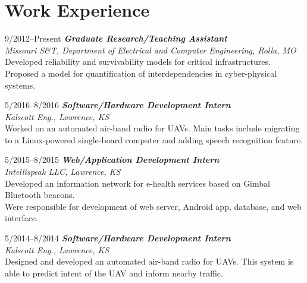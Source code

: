 \documentclass[10pt]{article}
\newlength{\Vspace}
\newlength{\Vspace}
\begin{document}
\section{Work Experience}

\begin{CV}

\item[9/2012--Present] \textbf{\textit{Graduate Research/Teaching Assistant}} \\
    \textit{Missouri S\&T, Department of Electrical and Computer Engineering, Rolla, MO}\vspace{\Vspace} \\
    Developed reliability and survivability models for critical infrastructures. \\
    Proposed a model for quantification of interdependencies in cyber-physical systems. \\

\item[5/2016--8/2016] \textbf{\textit{Software/Hardware Development Intern}} \\
    \textit{Kalscott Eng., Lawrence, KS}\vspace{\Vspace} \\
    Worked on an automated air-band radio for UAVs. Main tasks include migrating to a Linux-powered single-board computer and adding speech recognition feature.

\item[5/2015--8/2015] \textbf{\textit{Web/Application Development Intern}} \\
    \textit{Intellispeak LLC, Lawrence, KS}\vspace{\Vspace} \\
    Developed an information network for e-health services based on Gimbal Bluetooth beacons. \\
    Were responsible for development of web server, Android app, database, and web interface.

\item[5/2014--8/2014] \textbf{\textit{Software/Hardware Development Intern}} \\
    \textit{Kalscott Eng., Lawrence, KS}\vspace{\Vspace} \\
    Designed and developed an automated air-band radio for UAVs. This system is able to predict intent of the UAV and inform nearby traffic.


\end{CV}
\end{document}
